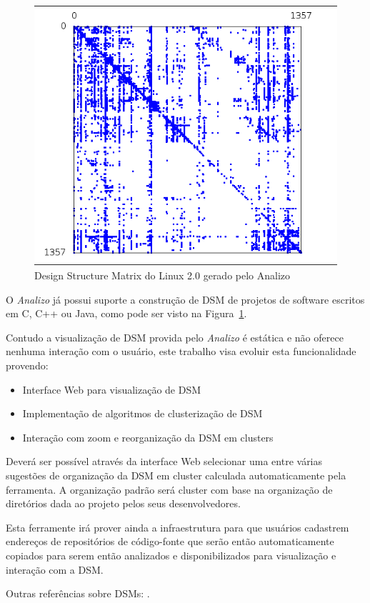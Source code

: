 \documentclass{article}
\begin{document}
\begin{figure}[h]
\center
\includegraphics[scale=0.5]{linux.png}
\caption{Design Structure Matrix do Linux 2.0 gerado pelo Analizo}
\label{fig:dsm}
\end{figure}

O {\it Analizo} já possui suporte a construção de DSM de projetos de software
escritos em C, C++ ou Java, como pode ser visto na Figura~\ref{fig:dsm}.

Contudo a visualização de DSM provida pelo {\it Analizo} é estática e não
oferece nenhuma interação com o usuário, este trabalho visa evoluir esta
funcionalidade provendo:

\begin{itemize}
  \item Interface Web para visualização de DSM
  \item Implementação de algoritmos de clusterização de DSM
  \item Interação com zoom e reorganização da DSM em clusters
\end{itemize}

Deverá ser possível através da interface Web selecionar uma entre várias
sugestões de organização da DSM em cluster calculada automaticamente pela
ferramenta. A organização padrão será cluster com base na organização de
diretórios dada ao projeto pelos seus desenvolvedores.

Esta ferramente irá prover ainda a infraestrutura para que usuários cadastrem
endereços de repositórios de código-fonte que serão então automaticamente
copiados para serem então analizados e disponibilizados para visualização e
interação com a DSM.

Outras referências sobre DSMs:
\cite{AKnowledgeBased, AnalyzingTheEvolution, AntaresDSM, ApplyingTheDesign,
DesignSuite, EfficientOrganizing, ReachabilityMatrices, TheStructureAndValue}.



\end{document}
